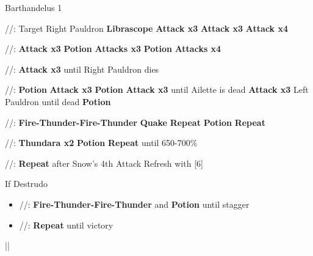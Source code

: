 \begin{fight}{Barthandelus 1}
	\item [1] \com/\syn/\com: Target Right Pauldron \to \textbf{Librascope} \to \textbf{Attack x3} \to \textbf{Attack x3} \to \textbf{Attack x4}
	\item [6] \com/\com/\com: \textbf{Attack x3} \to \textbf{Potion} \to \textbf{Attacks x3} \to \textbf{Potion} \to \textbf{Attacks x4}
	\item [5] \com/\com/\com: \textbf{Attack x3} until Right Pauldron dies
	\item [1] \com/\syn/\com: \textbf{Potion} \to \textbf{Attack x3} \to \textbf{Potion} \to \textbf{Attack x3} until Ailette is dead \to \textbf{Attack x3} Left Pauldron until dead \to \textbf{Potion}
	\item [2] \rav/\rav/\rav: \textbf{Fire-Thunder-Fire-Thunder} \to \textbf{Quake} \to \textbf{Repeat} \to \textbf{Potion} \to \textbf{Repeat}
	\item [4] \rav/\rav/\rav: \textbf{Thundara x2} \to \textbf{Potion} \to \textbf{Repeat} until 650-700\%
	\item [5] \com/\com/\com: \textbf{Repeat} after Snow's 4th Attack \to Refresh with [6]
	\item If Destrudo
	\begin{itemize}
		\item [4] \rav/\rav/\rav: \textbf{Fire-Thunder-Fire-Thunder} and \textbf{Potion} until stagger
		\item [5] \com/\com/\com: \textbf{Repeat} until victory
	\end{itemize}
	\item||\save
\end{fight}
